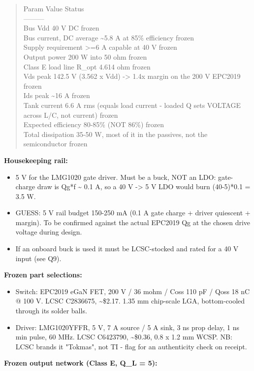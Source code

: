 \documentclass[11pt,a4paper]{article}
\begin{document}
\begin{quote}\small\ttfamily\raggedright
\textbar{} Param \textbar{} Value \textbar{} Status \textbar{}\\
\textbar{}---\textbar{}---\textbar{}---\textbar{}\\
\textbar{} Bus Vdd \textbar{} 40 V DC \textbar{} frozen \textbar{}\\
\textbar{} Bus current, DC average \textbar{} \textasciitilde{}5.8 A at 85\% efficiency \textbar{} frozen \textbar{}\\
\textbar{} Supply requirement \textbar{} \textgreater{}=6 A capable at 40 V \textbar{} frozen \textbar{}\\
\textbar{} Output power \textbar{} 200 W into 50 ohm \textbar{} frozen \textbar{}\\
\textbar{} Class E load line R\_opt \textbar{} 4.614 ohm \textbar{} frozen \textbar{}\\
\textbar{} Vds peak \textbar{} 142.5 V (3.562 x Vdd) -\textgreater{} 1.4x margin on the 200 V EPC2019 \textbar{} frozen \textbar{}\\
\textbar{} Ids peak \textbar{} \textasciitilde{}16 A \textbar{} frozen \textbar{}\\
\textbar{} Tank current \textbar{} 6.6 A rms (equals load current - loaded Q sets VOLTAGE across L/C, not current) \textbar{} frozen \textbar{}\\
\textbar{} Expected efficiency \textbar{} 80-85\% (NOT 86\%) \textbar{} frozen \textbar{}\\
\textbar{} Total dissipation \textbar{} 35-50 W, most of it in the passives, not the semiconductor \textbar{} frozen \textbar{}
\end{quote}
\textbf{Housekeeping rail:}

\begin{itemize}
\item 5 V for the LMG1020 gate driver. Must be a buck, NOT an LDO: gate-charge draw is Qg{*}f \textasciitilde{} 0.1 A,
so a 40 V -\textgreater{} 5 V LDO would burn (40-5){*}0.1 = 3.5 W.
\item GUESS: 5 V rail budget 150-250 mA (0.1 A gate charge + driver quiescent + margin). To be
confirmed against the actual EPC2019 Qg at the chosen drive voltage during design.
\item If an onboard buck is used it must be LCSC-stocked and rated for a 40 V input (see Q9).
\end{itemize}
\textbf{Frozen part selections:}

\begin{itemize}
\item Switch: EPC2019 eGaN FET, 200 V / 36 mohm / Coss 110 pF / Qoss 18 nC @ 100 V. LCSC C2836675,
\textasciitilde{}\$2.17. 1.35 mm chip-scale LGA, bottom-cooled through its solder balls.
\item Driver: LMG1020YFFR, 5 V, 7 A source / 5 A sink, 3 ns prop delay, 1 ns min pulse, 60 MHz.
LCSC C6423790, \textasciitilde{}\$0.36, 0.8 x 1.2 mm WCSP. NB: LCSC brands it "Tokmas", not TI - flag for an
authenticity check on receipt.
\end{itemize}
\textbf{Frozen output network (Class E, Q\_L = 5):}
\end{document}
